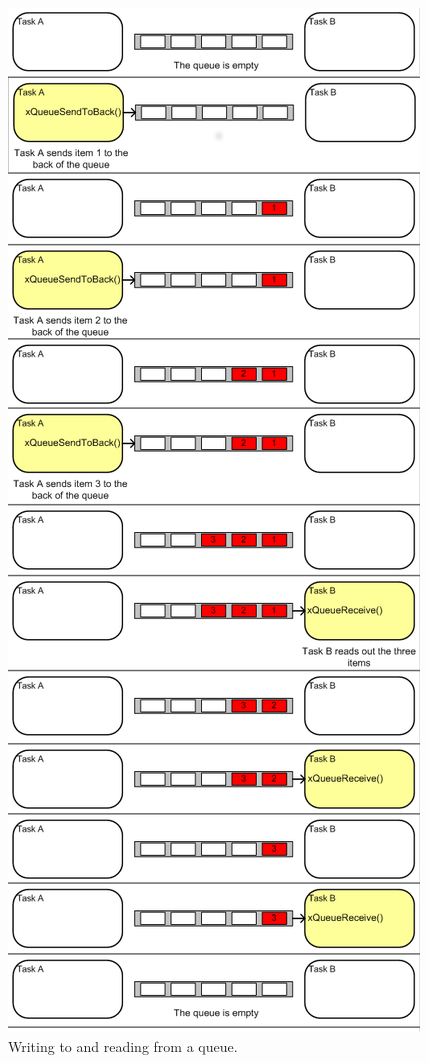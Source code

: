\begin{center}
 \begin{figure}[H]
	\centering
	\includegraphics[height=\textheight]{../images/implementation/embedded_server/queue_ipc.png}
	\caption{Writing to and reading from a queue.\cite{FreeRTOS_website}}
	\label{fig:queue_ipc}
 \end{figure}
\end{center}

